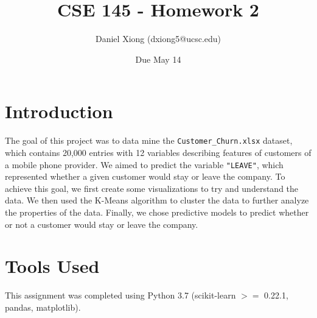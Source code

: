 \documentclass[12pt, notitlepage]{article}
\title{CSE 145 - Homework 2}
\author{Daniel Xiong (dxiong5@ucsc.edu)}
\date{Due May 14}
\begin{document}
\maketitle
\section{Introduction}
The goal of this project was to data mine the \texttt{Customer\_Churn.xlsx} dataset, which contains 20,000 entries with 12 variables describing features of customers of a mobile phone provider. We aimed to predict the variable \texttt{"LEAVE"}, which represented whether a given customer would stay or leave the company. To achieve this goal, we first create some visualizations to try and understand the data. We then used the K-Means algorithm to cluster the data to further analyze the properties of the data. Finally, we chose predictive models to predict whether or not a customer would stay or leave the company.

\section{Tools Used}
This assignment was completed using Python 3.7 (scikit-learn $>=$ 0.22.1, pandas, matplotlib).
\end{document}
